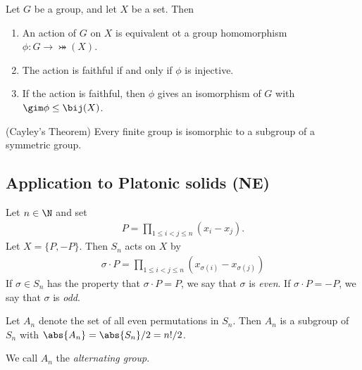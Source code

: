 \documentclass{article}
\begin{document}
\begin{theorem}
    Let $G$ be a group, and let $X$ be a set. Then
    \begin{enumerate}
        \item An action of $G$ on $X$ is equivalent ot a group homomorphism $\phi:G\to\bij(X)$.
        \item The action is faithful if and only if $\phi$ is injective.
        \item If the action is faithful, then $\phi$ gives an isomorphism of $G$ with $\gim\phi\leq\bij(X)$.
    \end{enumerate}
\end{theorem}

\begin{corollary}(Cayley's Theorem)
    Every finite group is isomorphic to a subgroup of a symmetric group. 
\end{corollary}

\subsection{Application to Platonic solids (NE)}

\begin{definition}
    Let $n\in\N$ and set
    \begin{align*}
        P=\prod_{1\leq i<j\leq n}(x_i-x_j).
    \end{align*}
    Let $X=\{P,-P\}$. Then $S_n$ acts on $X$ by
    \begin{align*}
        \sigma\cdot P= \prod_{1\leq i < j \leq n} (x_{\sigma(i)}-x_{\sigma(j)})
    \end{align*}
    If $\sigma\in S_n$ has the property that $\sigma\cdot P=P$,
    we say that $\sigma$ is \emph{even}. If $\sigma\cdot P=-P$,
    we say that $\sigma$ is \emph{odd}.
\end{definition}

\setcounter{theorem}{3}
\begin{theorem}
    Let $A_n$ denote the set of all even permutations in $S_n$.
    Then $A_n$ is a subgroup of $S_n$ with $\abs{A_n}=
    \abs{S_n}/2 = n!/2$. 
\end{theorem}

\begin{definition}
    We call $A_n$ the \emph{alternating group}.
\end{definition}
\end{document}
